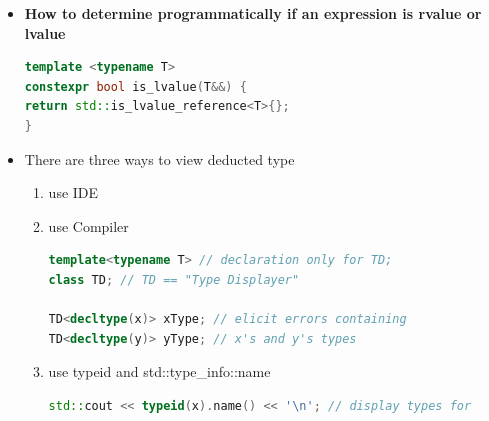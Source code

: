 \documentclass[a4paper,12pt,twoside]{book}
\begin{document}
\begin{itemize}
	\item \textbf{How to determine programmatically if an expression is rvalue or lvalue}
\begin{lstlisting}[frame=single, language=c++]
template <typename T>
constexpr bool is_lvalue(T&&) {
return std::is_lvalue_reference<T>{};
}
\end{lstlisting}
	\item There are three ways to view deducted type
	\begin{enumerate}
		\item use IDE
		\item use Compiler
\begin{lstlisting}[frame=single, language=c++]
template<typename T> // declaration only for TD;
class TD; // TD == "Type Displayer"

TD<decltype(x)> xType; // elicit errors containing
TD<decltype(y)> yType; // x's and y's types
\end{lstlisting}

	\item use typeid and std::type\_info::name
	
\begin{lstlisting}[frame=single, language=c++]
std::cout << typeid(x).name() << '\n'; // display types for
\end{lstlisting}
		
	\end{enumerate}
	
\end{itemize}
\end{document}
